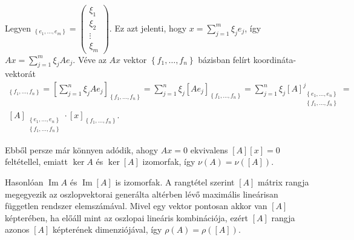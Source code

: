 \documentclass[9pt, a4paper, showtrims]{memoir}
\makeatletter
\renewenvironment{proof}[1][\proofname]
    {\par\pushQED{\qed}%
    \normalfont \topsep6\p@\@plus6\p@\relax
    \trivlist
    \item[\hskip\labelsep
        \itshape
    #1\@addpunct{:}]\ignorespaces}
    {\popQED\endtrivlist\@endpefalse}
\theoremstyle{plain}
\theoremstyle{remark}
\theoremstyle{definition}
\DeclareMathOperator{\im}{Im}
\makeatother
\begin{document}
\begin{proof}
    Legyen 
    \begin{math}
        [x]_{\left\{ e_1,\dots,e_m \right\}}
        =
        \begin{pmatrix}
            \xi_1\\ \xi_2 \\ \vdots \\ \xi_m
        \end{pmatrix}.
    \end{math}
    Ez azt jelenti, 
    hogy $x=\sum_{j=1}^m\xi_je_j$, így 
    $Ax=\sum_{j=1}^m\xi_jAe_j$.
    Véve az $Ax$ vektor $\left\{ f_1,\dots,f_n \right\}$ bázisban felírt koordináta-vektorát 
    \begin{multline*}
        [Ax]_{\left\{ f_1,\dots,f_n \right\}}
        =
        \left[ \sum_{j=1}^n\xi_jAe_j \right]_{\left\{ f_1,\dots,f_n \right\}}
        =
        \sum_{j=1}^n\xi_j[Ae_j]_{\left\{ f_1,\dots,f_n \right\}}
        =
        \sum_{j=1}^n\xi_j[A]_{\substack{\left\{ e_1,\dots,e_n \right\}\\ \left\{ f_1,\dots,f_n \right\}}}^j
        =\\
        [A]_{\substack{\left\{ e_1,\dots,e_n \right\}\\ \left\{ f_1,\dots,f_n \right\}}}
        \cdot 
        [x]_{\left\{ f_1,\dots,f_n \right\}}.
    \end{multline*}

    Ebből persze már könnyen adódik, ahogy $Ax=0$ ekvivalens $[A][x]=0$ feltétellel, emiatt 
    $\ker A$ és $\ker [A]$ izomorfak, 
    így $\nu(A)=\nu([A])$.

    Hasonlóan $\im A$ és $\im [A]$ is izomorfak.
    A rangtétel szerint $[A]$ mátrix rangja megegyezik az oszlopvektorai generálta altérben lévő maximális lineárisan
    független rendszer elemszámával.
    Mivel egy vektor pontosan akkor van $[A]$ képterében, ha előáll mint az oszlopai lineáris kombinációja,
    ezért $[A]$ rangja azonos $[A]$ képterének dimenziójával, 
    így $\rho(A)=\rho([A])$.
\end{proof}
\end{document}
